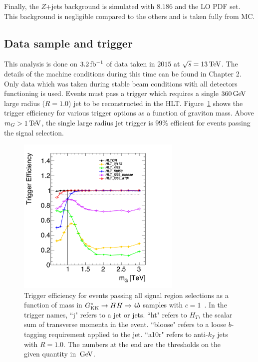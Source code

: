 Finally, the $Z$+jets background is simulated with \PYTHIA $8.186$ and the  LO PDF set. This background is negligible compared to the others and is taken fully from MC. 

\subsection{Data sample and trigger}

This analysis is done on $3.2 \mbox{\,fb$^{-1}$}$ of data taken in $2015$ at $\sqrt{s} = 13 \TeV$. The details of the machine conditions during this time can be found in Chapter 2. Only data which was taken during stable beam conditions with all detectors functioning is used. Events must pass a trigger which requires a single $360 \GeV$ large radius ($R=1.0$) jet to be reconstructed in the HLT. Figure~\ref{fig:trig_eff_4b} shows the trigger efficiency for various trigger options as a function of graviton mass. Above $m_{G} > 1 \TeV$, the single large radius jet trigger is $99\%$ efficient for events passing the signal selection. 

\begin{figure}[h!]
  \centering
  \captionsetup{justification=centering}

  \includegraphics[width=0.7\textwidth]{figures/PassSignal_HLTeff}
  \caption{Trigger efficiency for events passing all signal region selections as a function of mass in $G^*_{\rm KK} \to HH \to 4b$ samples with $c = 1$~\cite{Tony}. In the trigger names, ``j" refers to a jet or jets. ``ht" refers to $H_{T}$, the scalar sum of transverse momenta in the event. ``bloose" refers to a loose $b$-tagging requirement applied to the jet. ``a10r" refers to anti-$k_{T}$ jets with $R = 1.0$. The numbers at the end are the thresholds on the given quantity in $\GeV$.}
  \label{fig:trig_eff_4b}
\end{figure}

